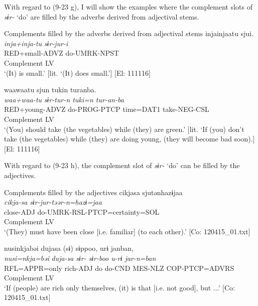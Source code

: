 With regard to (9-23 g), I will show the examples where the complement slots of \textit{sɨr-} ‘do’ are filled by the adverbs derived from adjectival stems.

\ea   Complements filled by the adverbs derived from adjectival stems \label{ex:9.31}
\ea %
 \gllll  injainjaatu  sjui.\\
      \textit{inja+inja-tu}  \textit{sɨr{}-jur-i}\\
      RED+small-ADVZ  do-UMRK-NPST\\
      Complement  LV\\
      \glt       ‘(It) is small.’ [lit. ‘(It) does small.’] [El: 111116]

\ex \label{ex:9.31b} %
    \gllll  waawaatu  sjun  tukin  turanba.\\
      \textit{waa+waa-tu}  \textit{sɨr{}-tur-n  tuki=n  tur-an-ba}\\
      RED+young-ADVZ  do-PROG-PTCP  time=DAT1  take-NEG-CSL\\
      Complement  LV    \\
      \glt  ‘(You) should take (the vegetables) while (they) are green.’ [lit. ‘If (you) don’t take (the vegetables) while (they) are doing young, (they will become bad soon).] [El: 111116]
    \z
\z

With regard to (9-23 h), the complement slot of \textit{sɨr-} ‘do’ can be filled by the adjectives.

\ea   Complements filled by the adjectives \label{ex:9.32}
\ea %
 \gllll  cikjasa  sjutənhazɨjaa\\
      \textit{cikja-sa}  \textit{sɨr{}-jur-təər-n=hazɨ=jaa}\\
      close-ADJ  do-UMRK-RSL-PTCP=certainty=SOL\\
      Complement  LV\\
      \glt       ‘(They) must have been close [i.e. familiar] (to each other).’ [Co: 120415\_01.txt]

\ex \label{ex:9.32b} %
    \gllll  nusinkjabəi  dujasa  (sɨ)  sɨppoo,  urɨ  janban,\\
      \textit{nusi=nkja=bəi}  \textit{duja-sa}  \textit{sɨr-}  \textit{sɨr{}-boo  u-rɨ  jar-n=ban}\\
      RFL=APPR=only  rich-ADJ  do  do-CND  MES-NLZ  COP-PTCP=ADVRS\\
        Complement    LV    \\
      \glt       ‘If (people) are rich only themselves, (it) is that [i.e. not good], but ...’ [Co: 120415\_01.txt]

